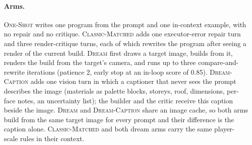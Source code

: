 \paragraph{Arms.}
\textsc{One-Shot} writes one program from the prompt and one in-context example, with no repair and no critique. %
\textsc{Classic-Matched} adds one executor-error repair turn and three render-critique turns, each of which rewrites the program after seeing a render of the current build. %
\textsc{Dream} first draws a target image, builds from it, renders the build from the target's camera, and runs up to three compare-and-rewrite iterations (patience 2, early stop at an in-loop score of 0.85). %
\textsc{Dream-Caption} adds one vision turn in which a captioner that never sees the prompt describes the image (materials as palette blocks, storeys, roof, dimensions, per-face notes, an uncertainty list); the builder and the critic receive this caption beside the image. %
\textsc{Dream} and \textsc{Dream-Caption} share an image cache, so both arms build from the same target image for every prompt and their difference is the caption alone. %
\textsc{Classic-Matched} and both dream arms carry the same player-scale rules in their context. %

